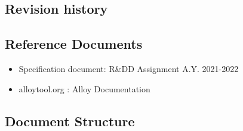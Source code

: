 \subsection{Revision history}

\subsection{Reference Documents}
\begin{itemize}
    \item Specification document: R\&DD Assignment A.Y. 2021-2022
    \item alloytool.org : Alloy Documentation
\end{itemize}

\subsection{Document Structure}

